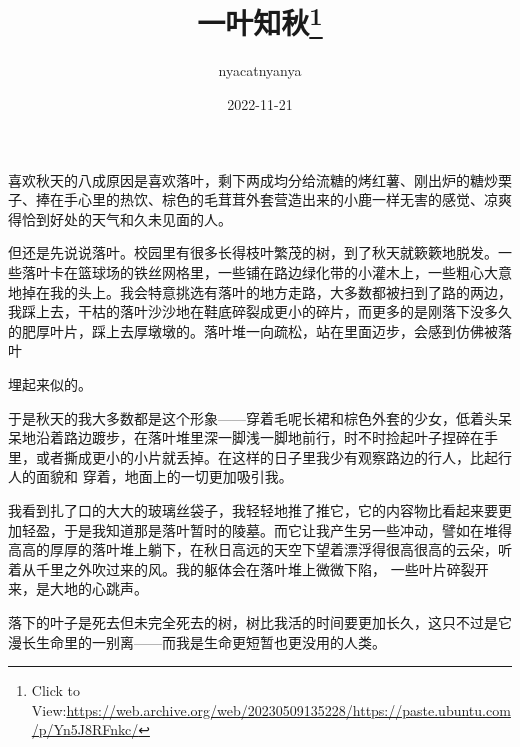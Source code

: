 \documentclass{article}
\title{一叶知秋\footnote{Click to View:\url{https://web.archive.org/web/20230509135228/https://paste.ubuntu.com/p/Yn5J8RFnkc/}}}
\author{nyacatnyanya}
\date{2022-11-21}
\begin{document}

\maketitle


\Large

﻿喜欢秋天的八成原因是喜欢落叶，剩下两成均分给流糖的烤红薯、刚出炉的糖炒栗子、捧在手心里的热饮、棕色的毛茸茸外套营造出来的小鹿一样无害的感觉、凉爽得恰到好处的天气和久未见面的人。
 

但还是先说说落叶。校园里有很多长得枝叶繁茂的树，到了秋天就簌簌地脱发。一些落叶卡在篮球场的铁丝网格里，一些铺在路边绿化带的小灌木上，一些粗心大意地掉在我的头上。我会特意挑选有落叶的地方走路，大多数都被扫到了路的两边，我踩上去，干枯的落叶沙沙地在鞋底碎裂成更小的碎片，而更多的是刚落下没多久的肥厚叶片，踩上去厚墩墩的。落叶堆一向疏松，站在里面迈步，会感到仿佛被落叶

\newpage
埋起来似的。 

于是秋天的我大多数都是这个形象——穿着毛呢长裙和棕色外套的少女，低着头呆呆地沿着路边踱步，在落叶堆里深一脚浅一脚地前行，时不时捡起叶子捏碎在手里，或者撕成更小的小片就丢掉。在这样的日子里我少有观察路边的行人，比起行人的面貌和
穿着，地面上的一切更加吸引我。 

我看到扎了口的大大的玻璃丝袋子，我轻轻地推了推它，它的内容物比看起来要更加轻盈，于是我知道那是落叶暂时的陵墓。而它让我产生另一些冲动，譬如在堆得高高的厚厚的落叶堆上躺下，在秋日高远的天空下望着漂浮得很高很高的云朵，听着从千里之外吹过来的风。我的躯体会在落叶堆上微微下陷，
一些叶片碎裂开来，是大地的心跳声。 

落下的叶子是死去但未完全死去的树，树比我活的时间要更加长久，这只不过是它漫长生命里的一别离——而我是生命更短暂也更没用的人类。
\end{document}
